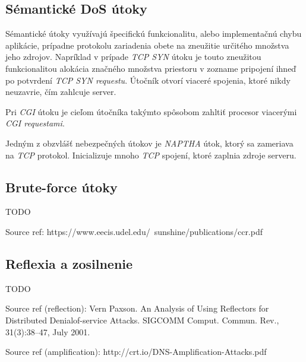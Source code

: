 \documentclass[
  printed, %
  table,   %
  lof,     %
  lot,     %
]{fithesis3}
\begin{document}
\subsection{Sémantické DoS útoky}
Sémantické útoky využívajú špecifickú funkcionalitu, alebo implementačnú chybu aplikácie,
prípadne protokolu zariadenia obete na zneužitie určitého množstva jeho zdrojov. Napríklad
v prípade \textit{TCP SYN} útoku je touto zneužitou funkcionalitou alokácia značného množstva
priestoru v zozname pripojení ihneď po potvrdení \textit{ TCP SYN requestu}. Útočník otvorí
viaceré spojenia, ktoré nikdy neuzavrie, čím zahlcuje server. 

Pri \textit{CGI} útoku je cieľom útočníka takýmto spôsobom zahltiť procesor viacerými
\textit{CGI requestami}.

Jedným z obzvlášť nebezpečných útokov je \textit{NAPTHA} útok, ktorý sa zameriava na
\textit{TCP} protokol. Inicializuje mnoho \textit{TCP} spojení, ktoré zaplnia zdroje serveru.

\subsection{Brute-force útoky}
TODO 

Source ref: https://www.eecis.udel.edu/~sunshine/publications/ccr.pdf

\subsection{Reflexia a zosilnenie}
TODO

Source ref (reflection): Vern Paxson. An Analysis of Using Reflectors for Distributed Denialof-service Attacks. SIGCOMM Comput. Commun. Rev., 31(3):38–47, July 2001.

Source ref (amplification): http://crt.io/DNS-Amplification-Attacks.pdf
\end{document}
